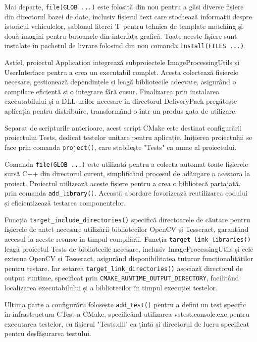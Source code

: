 \documentclass[a4paper,12pt]{report}
\begin{document}
Mai departe, \texttt{file(GLOB ...)} este folosită din nou pentru a găsi diverse fișiere din directorul bazei de date, inclusiv fișierul text care stochează informații despre istoricul vehiculelor, șablonul literei 'I' pentru tehnica de template matching și două imagini pentru butoanele din interfața grafică. Toate aceste fișiere sunt instalate în pachetul de livrare folosind din nou comanda \texttt{install(FILES ...)}.

Astfel,  proiectul Application integrează subproiectele ImageProcessingUtils și UserInterface pentru a crea un executabil complet. Acesta colectează fișierele necesare, gestionează dependințele și leagă bibliotecile adecvate, asigurând o compilare eficientă și o integrare fără cusur. Finalizarea prin instalarea executabilului și a DLL-urilor necesare în directorul DeliveryPack pregătește aplicația pentru distribuire, transformând-o într-un produs gata de utilizare.

Separat de scripturile anterioare, acest script CMake este destinat configurării proiectului Tests, dedicat testelor unitare pentru aplicație. Inițierea proiectului se face prin comanda \texttt{project()}, care stabilește "Tests" ca nume al proiectului.

Comanda \texttt{file(GLOB ...)} este utilizată pentru a colecta automat toate fișierele sursă C++ din directorul curent, simplificând procesul de adăugare a acestora la proiect. Proiectul utilizează aceste fișiere pentru a crea o bibliotecă partajată, prin comanda \texttt{add\_library()}. Această abordare favorizează reutilizarea codului și eficientizează testarea componentelor.

Funcția \texttt{target\_include\_directories()} specifică directoarele de căutare pentru fișierele de antet necesare utilizării bibliotecilor OpenCV și Tesseract, garantând accesul la aceste resurse în timpul compilării. Funcția  \texttt{target\_link\_libraries()} leagă proiectul Tests de bibliotecile necesare, inclusiv ImageProcessingUtils și cele externe OpenCV și Tesseract, asigurând disponibilitatea tuturor funcționalităților pentru testare. Iar setarea \texttt{target\_link\_directories()} asociază directorul de output runtime, specificat prin \texttt{CMAKE\_RUNTIME\_OUTPUT\_DIRECTORY}, facilitând localizarea executabilului și a bibliotecilor în timpul execuției testelor.

Ultima parte a configurării folosește \texttt{add\_test()} pentru a defini un test specific în infrastructura CTest a CMake, specificând utilizarea vstest.console.exe pentru executarea testelor, cu fișierul "Tests.dll" ca țintă și directorul de lucru specificat pentru desfășurarea testului.
\end{document}
